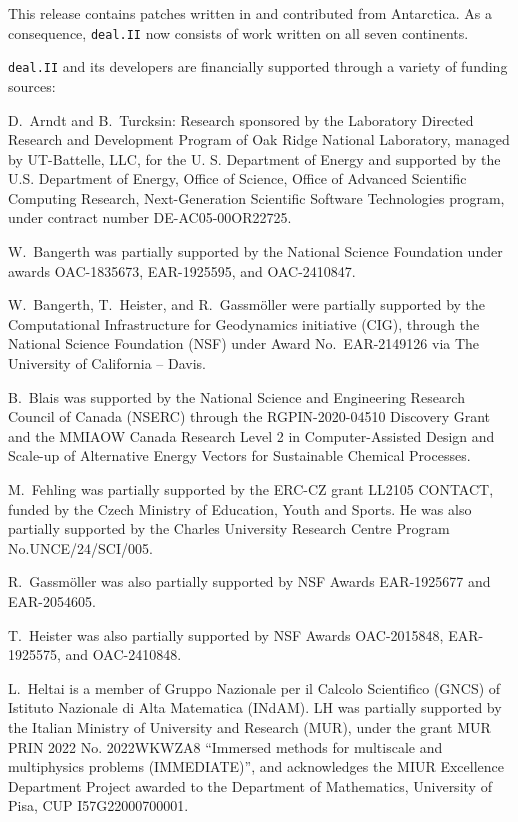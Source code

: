 \documentclass{ansarticle-preprint}
\newcommand{\specialword}[1]{\texttt{#1}}
\newcommand{\dealii}{{\specialword{deal.II}}\xspace}
\begin{document}
This release contains patches written in and contributed from
Antarctica. As a consequence, \dealii{} now consists of work written
on all seven continents.

\bigskip

\dealii and its developers are financially supported through a
variety of funding sources:

D.~Arndt and B.~Turcksin: Research sponsored by the Laboratory Directed Research and
Development Program of Oak Ridge National Laboratory, managed by UT-Battelle,
LLC, for the U. S. Department of Energy and supported by the U.S. Department of Energy,
Office of Science, Office of Advanced Scientific Computing Research,
Next-Generation Scientific Software Technologies program, under contract
number DE-AC05-00OR22725.

W.~Bangerth was partially supported by the National Science Foundation
under awards OAC-1835673, EAR-1925595, and OAC-2410847.

W.~Bangerth, T.~Heister, and R.~Gassm\"{o}ller were partially
supported by the Computational Infrastructure for Geodynamics initiative
(CIG), through the National Science Foundation (NSF) under Award
No.~EAR-2149126 via The University of California -- Davis.


B.~Blais was supported by the National Science and Engineering Research Council of Canada (NSERC)  through the RGPIN-2020-04510 Discovery Grant and the MMIAOW Canada Research Level 2 in Computer-Assisted Design and Scale-up of Alternative Energy Vectors for Sustainable Chemical Processes.

M.~Fehling was partially supported by the ERC-CZ grant LL2105 CONTACT,
funded by the Czech Ministry of Education, Youth and Sports. He was also
partially supported by the Charles University Research Centre Program No.\@ UNCE/24/SCI/005.

R.~Gassm\"{o}ller was also partially supported by NSF Awards EAR-1925677
and EAR-2054605.

T.~Heister was also partially supported by NSF Awards OAC-2015848, EAR-1925575, and OAC-2410848.

L.~Heltai is a member of Gruppo Nazionale per il Calcolo Scientifico (GNCS) of
Istituto Nazionale di Alta Matematica (INdAM). LH was partially supported by
the Italian Ministry of University and Research (MUR), under the grant MUR PRIN
2022 No. 2022WKWZA8 ``Immersed methods for multiscale and multiphysics problems
(IMMEDIATE)'', and acknowledges the MIUR Excellence Department Project awarded
to the Department of Mathematics, University of Pisa, CUP I57G22000700001.
\end{document}
